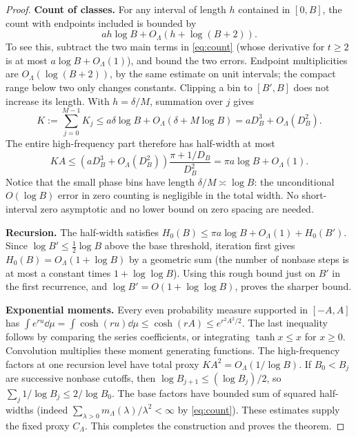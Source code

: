 \documentclass[11pt]{article}
\theoremstyle{definition}\newtheorem{definition}[theorem]{Definition}
\begin{document}
\begin{proof}
\textbf{Count of classes.} For any interval of length $h$ contained in $[0,B]$, the count with endpoints included is bounded by
\begin{equation}\label{eq:local}
 a h\log B+O_\Lambda(h+\log(B+2)).
\end{equation}
To see this, subtract the two main terms in \eqref{eq:count} (whose derivative for $t\ge2$ is at most $a\log B+O_\Lambda(1)$), and bound the two errors. Endpoint multiplicities are $O_\Lambda(\log(B+2))$, by the same estimate on unit intervals; the compact range below two only changes constants. Clipping a bin to $[B',B]$ does not increase its length. With $h=\delta/M$, summation over $j$ gives
\[
 K:=\sum_{j=0}^{M-1}K_j\le a\delta\log B+O_\Lambda(\delta+M\log B)
 =aD_B^3+O_\Lambda(D_B^2).
\]
The entire high-frequency part therefore has half-width at most
\begin{equation}\label{eq:highwidth}
 K A\le\left(aD_B^3+O_\Lambda(D_B^2)\right)\frac{\pi+1/D_B}{D_B^2}
 =\pi a\log B+O_\Lambda(1).
\end{equation}
Notice that the small phase bins have length $\delta/M\asymp\log B$: the unconditional $O(\log B)$ error in zero counting is negligible in the total width. No short-interval zero asymptotic and no lower bound on zero spacing are needed.

\textbf{Recursion.} The half-width satisfies $H_0(B)\le\pi a\log B+O_\Lambda(1)+H_0(B')$. Since $\log B'\le\tfrac12\log B$ above the base threshold, iteration first gives $H_0(B)=O_\Lambda(1+\log B)$ by a geometric sum (the number of nonbase steps is at most a constant times $1+\log\log B$). Using this rough bound just on $B'$ in the first recurrence, and $\log B'=O(1+\log\log B)$, proves the sharper bound.

\textbf{Exponential moments.} Every even probability measure supported in $[-A,A]$ has $\int e^{ru}\dd\mu=\int\cosh(ru)\dd\mu\le\cosh(rA)\le e^{r^2A^2/2}$. The last inequality follows by comparing the series coefficients, or integrating $\tanh x\le x$ for $x\ge0$. Convolution multiplies these moment generating functions. The high-frequency factors at one recursion level have total proxy $K A^2=O_\Lambda(1/\log B)$. If $B_0<B_j$ are successive nonbase cutoffs, then $\log B_{j+1}\le(\log B_j)/2$, so $\sum_j1/\log B_j\le2/\log B_0$. The base factors have bounded sum of squared half-widths (indeed $\sum_{\lambda>0}m_\Lambda(\lambda)/\lambda^2<\infty$ by \eqref{eq:count}). These estimates supply the fixed proxy $C_\Lambda$. This completes the construction and proves the theorem.
\end{proof}
\end{document}
